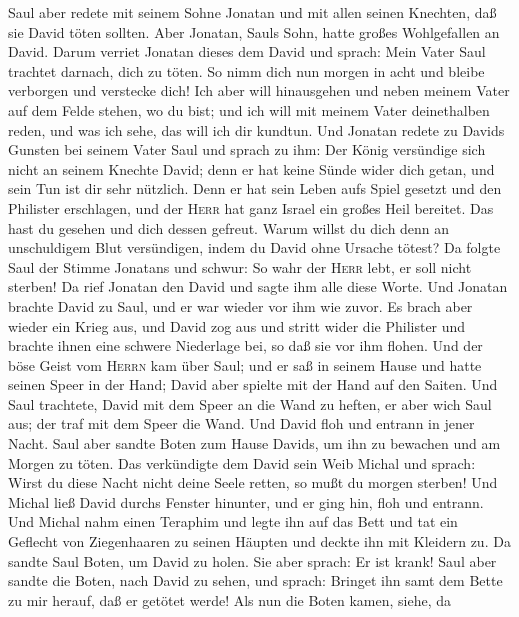  Saul aber redete mit seinem Sohne Jonatan und mit allen
seinen Knechten, daß sie David töten sollten. Aber Jonatan, Sauls Sohn,
hatte großes Wohlgefallen an David.  Darum verriet Jonatan
dieses dem David und sprach: Mein Vater Saul trachtet darnach, dich zu
töten. So nimm dich nun morgen in acht und bleibe verborgen und
verstecke dich!  Ich aber will hinausgehen und neben
meinem Vater auf dem Felde stehen, wo du bist; und ich will mit meinem
Vater deinethalben reden, und was ich sehe, das will ich dir kundtun.
 Und Jonatan redete zu Davids Gunsten bei seinem Vater
Saul und sprach zu ihm: Der König versündige sich nicht an seinem
Knechte David; denn er hat keine Sünde wider dich getan, und sein Tun
ist dir sehr nützlich.  Denn er hat sein Leben aufs Spiel
gesetzt und den Philister erschlagen, und der \textsc{Herr} hat ganz
Israel ein großes Heil bereitet. Das hast du gesehen und dich dessen
gefreut. Warum willst du dich denn an unschuldigem Blut versündigen,
indem du David ohne Ursache tötest?  Da folgte Saul der
Stimme Jonatans und schwur: So wahr der \textsc{Herr} lebt, er soll
nicht sterben!  Da rief Jonatan den David und sagte ihm
alle diese Worte. Und Jonatan brachte David zu Saul, und er war wieder
vor ihm wie zuvor.  Es brach aber wieder ein Krieg aus,
und David zog aus und stritt wider die Philister und brachte ihnen eine
schwere Niederlage bei, so daß sie vor ihm flohen.  Und
der böse Geist vom \textsc{Herrn} kam über Saul; und er saß in seinem
Hause und hatte seinen Speer in der Hand; David aber spielte mit der
Hand auf den Saiten.  Und Saul trachtete, David mit dem
Speer an die Wand zu heften, er aber wich Saul aus; der traf mit dem
Speer die Wand. Und David floh und entrann in jener Nacht.
 Saul aber sandte Boten zum Hause Davids, um ihn zu
bewachen und am Morgen zu töten. Das verkündigte dem David sein Weib
Michal und sprach: Wirst du diese Nacht nicht deine Seele retten, so
mußt du morgen sterben!  Und Michal ließ David durchs
Fenster hinunter, und er ging hin, floh und entrann.  Und
Michal nahm einen Teraphim und legte ihn auf das Bett und tat ein
Geflecht von Ziegenhaaren zu seinen Häupten und deckte ihn mit Kleidern
zu.  Da sandte Saul Boten, um David zu holen. Sie aber
sprach: Er ist krank!  Saul aber sandte die Boten, nach
David zu sehen, und sprach: Bringet ihn samt dem Bette zu mir herauf,
daß er getötet werde!  Als nun die Boten kamen, siehe, da

